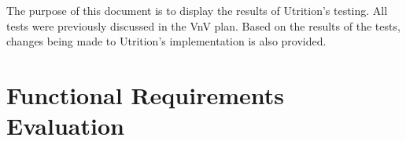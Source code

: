 \documentclass[12pt, titlepage]{article}
\begin{document}
	
	\newpage
	
	\tableofcontents
	
	\listoftables %
	
	\listoffigures %
	
	\newpage
	
	
	The purpose of this document is to display the results of Utrition's testing. All tests were previously discussed in the VnV plan. Based on the results of the tests, changes being made to Utrition's implementation is also provided. 
	
	\section{Functional Requirements Evaluation}
\end{document}
